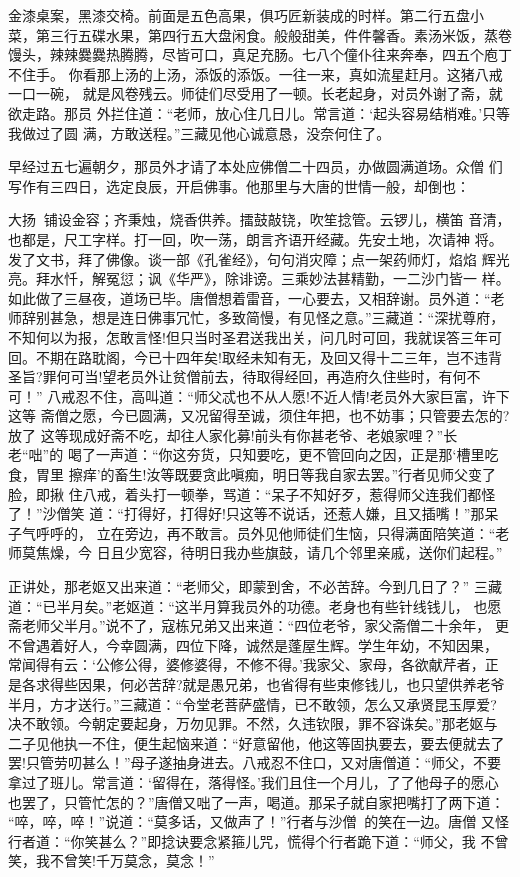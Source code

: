 金漆桌案，黑漆交椅。前面是五色高果，俱巧匠新装成的时样。第二行五盘小
菜，第三行五碟水果，第四行五大盘闲食。般般甜美，件件馨香。素汤米饭，蒸卷
馒头，辣辣爨爨热腾腾，尽皆可口，真足充肠。七八个僮仆往来奔奉，四五个庖丁
不住手。
你看那上汤的上汤，添饭的添饭。一往一来，真如流星赶月。这猪八戒一口一碗，
就是风卷残云。师徒们尽受用了一顿。长老起身，对员外谢了斋，就欲走路。那员
外拦住道：“老师，放心住几日儿。常言道：‘起头容易结梢难。’只等我做过了圆
满，方敢送程。”三藏见他心诚意恳，没奈何住了。

早经过五七遍朝夕，那员外才请了本处应佛僧二十四员，办做圆满道场。众僧
们写作有三四日，选定良辰，开启佛事。他那里与大唐的世情一般，却倒也：

大扬，铺设金容；齐秉烛，烧香供养。擂鼓敲铙，吹笙捻管。云锣儿，横笛
音清，也都是，尺工字样。打一回，吹一荡，朗言齐语开经藏。先安土地，次请神
将。发了文书，拜了佛像。谈一部《孔雀经》，句句消灾障；点一架药师灯，焰焰
辉光亮。拜水忏，解冤愆；讽《华严》，除诽谤。三乘妙法甚精勤，一二沙门皆一
样。
如此做了三昼夜，道场已毕。唐僧想着雷音，一心要去，又相辞谢。员外道：“老
师辞别甚急，想是连日佛事冗忙，多致简慢，有见怪之意。”三藏道：“深扰尊府，
不知何以为报，怎敢言怪!但只当时圣君送我出关，问几时可回，我就误答三年可
回。不期在路耽阁，今已十四年矣!取经未知有无，及回又得十二三年，岂不违背
圣旨?罪何可当!望老员外让贫僧前去，待取得经回，再造府久住些时，有何不可！”
八戒忍不住，高叫道：“师父忒也不从人愿!不近人情!老员外大家巨富，许下这等
斋僧之愿，今已圆满，又况留得至诚，须住年把，也不妨事；只管要去怎的?放了
这等现成好斋不吃，却往人家化募!前头有你甚老爷、老娘家哩？”长老“咄”的
喝了一声道：“你这夯货，只知要吃，更不管回向之因，正是那‘槽里吃食，胃里
擦痒’的畜生!汝等既要贪此嗔痴，明日等我自家去罢。”行者见师父变了脸，即揪
住八戒，着头打一顿拳，骂道：“呆子不知好歹，惹得师父连我们都怪了！”沙僧笑
道：“打得好，打得好!只这等不说话，还惹人嫌，且又插嘴！”那呆子气呼呼的，
立在旁边，再不敢言。员外见他师徒们生恼，只得满面陪笑道：“老师莫焦燥，今
日且少宽容，待明日我办些旗鼓，请几个邻里亲戚，送你们起程。”

正讲处，那老妪又出来道：“老师父，即蒙到舍，不必苦辞。今到几日了？”
三藏道：“已半月矣。”老妪道：“这半月算我员外的功德。老身也有些针线钱儿，
也愿斋老师父半月。”说不了，寇栋兄弟又出来道：“四位老爷，家父斋僧二十余年，
更不曾遇着好人，今幸圆满，四位下降，诚然是蓬屋生辉。学生年幼，不知因果，
常闻得有云：‘公修公得，婆修婆得，不修不得。’我家父、家母，各欲献芹者，正
是各求得些因果，何必苦辞?就是愚兄弟，也省得有些束修钱儿，也只望供养老爷
半月，方才送行。”三藏道：“令堂老菩萨盛情，已不敢领，怎么又承贤昆玉厚爱?
决不敢领。今朝定要起身，万勿见罪。不然，久违钦限，罪不容诛矣。”那老妪与
二子见他执一不住，便生起恼来道：“好意留他，他这等固执要去，要去便就去了
罢!只管劳叨甚么！”母子遂抽身进去。八戒忍不住口，又对唐僧道：“师父，不要
拿过了班儿。常言道：‘留得在，落得怪。’我们且住一个月儿，了了他母子的愿心
也罢了，只管忙怎的？”唐僧又咄了一声，喝道。那呆子就自家把嘴打了两下道：
“啐，啐，啐！”说道：“莫多话，又做声了！”行者与沙僧的笑在一边。唐僧
又怪行者道：“你笑甚么？”即捻诀要念紧箍儿咒，慌得个行者跪下道：“师父，我
不曾笑，我不曾笑!千万莫念，莫念！”

